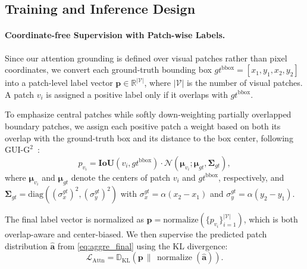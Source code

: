 \subsection{Training and Inference Design}
\paragraph{Coordinate-free Supervision with Patch-wise Labels.} \label{sec:label}
Since our attention grounding is defined over visual patches rather than pixel coordinates, we convert each ground-truth bounding box $gt^{\mathrm{bbox}}=[x_1,y_1,x_2,y_2]$ into a patch-level label vector $\bm{p}\in\mathbb{R}^{|\mathcal{V}|}$, where $|\mathcal{V}|$ is the number of visual patches. A patch $v_i$ is assigned a positive label only if it overlaps with $gt^{\mathrm{bbox}}$.

To emphasize central patches while softly down-weighting partially overlapped boundary patches, we assign each positive patch a weight based on both its overlap with the ground-truth box and its distance to the box center, following GUI-$\text{G}^2$~\citep{tang2025gui}:
\begin{equation}
    p_{v_i}
    =\textbf{IoU}(v_i,gt^{\mathrm{bbox}})\cdot
    \mathcal{N}\!\left(\boldsymbol{\mu}_{v_i};\boldsymbol{\mu}_{gt},\boldsymbol{\Sigma}_{gt}\right),
    \label{eq:labeling}
\end{equation}
where $\boldsymbol{\mu}_{v_i}$ and $\boldsymbol{\mu}_{gt}$ denote the centers of patch $v_i$ and $gt^{\mathrm{bbox}}$, respectively, and
$\boldsymbol{\Sigma}_{gt}=\mathrm{diag}\!\left((\sigma_x^{gt})^2,(\sigma_y^{gt})^2\right)$ with
$\sigma_x^{gt}=\alpha(x_2-x_1)$ and $\sigma_y^{gt}=\alpha(y_2-y_1)$. 

The final label vector is normalized as
$\bm{p}=\mathrm{normalize}(\{p_{v_i}\}_{i=1}^{|\mathcal{V}|})$,
which is both overlap-aware and center-biased. We then supervise the predicted patch distribution $\hat{\mathbf{a}}$ from \cref{eq:aggre_final} using the KL divergence:
\[
    \mathcal{L}_{\text{Attn}}=\mathbb{D}_{\mathrm{KL}}(\bm{p}\,\|\,\operatorname{normalize}(\hat{\mathbf{a}})).
\]

